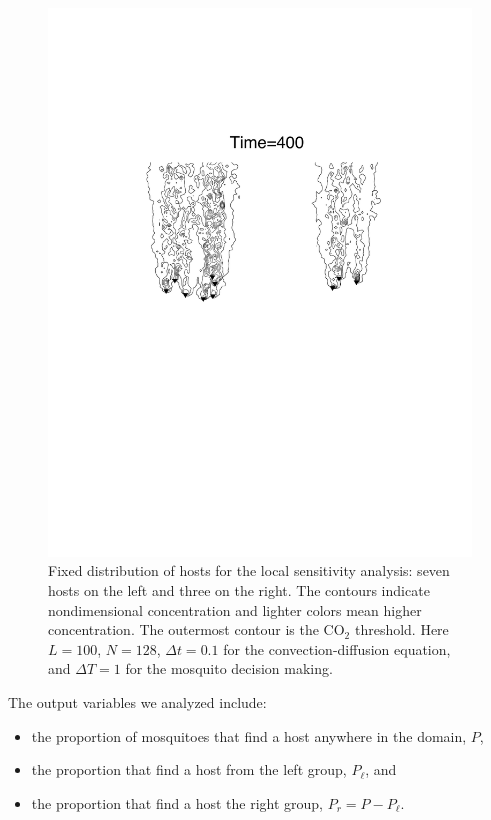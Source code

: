\documentclass[12pt]{article}
\newcommand{\mycaption}[1]{\caption{#1}}
\begin{document}
\begin{figure}[hbt]
	\centering
 \includegraphics[width=5.0in]{figures/2groups_gray.pdf}

\mycaption{Fixed distribution of hosts for the local sensitivity analysis: seven hosts on the left and three on the right. The contours indicate nondimensional concentration and lighter colors mean higher concentration. The outermost contour is the CO$_2$ threshold. Here $L=100$, $N=128$, $\Delta t = 0.1$ for the convection-diffusion equation, and $\Delta T = 1$ for the mosquito decision making.
}
\label{fig:2groups}
\end{figure}
		


The output variables we analyzed include:
\begin{itemize}
\item the proportion of mosquitoes that find a host anywhere in the domain, $P$,
\item the proportion that find a host from the left group, $P_\ell$, and
\item the proportion that find a host the right group, $P_r = P - P_\ell$.
\end{itemize}
\end{document}
